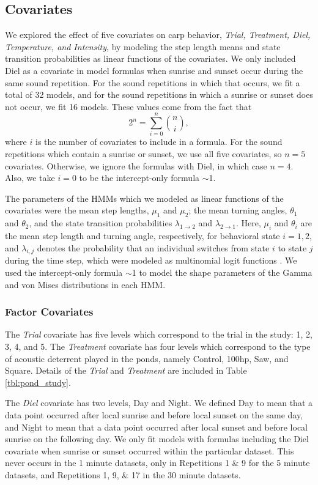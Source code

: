 \documentclass[12pt]{article}
\begin{document}
	\subsection{Covariates}
	
	We explored the effect of five covariates on carp behavior, \emph{Trial, Treatment, Diel, Temperature, and Intensity}, by modeling the step length means and state transition probabilities as linear functions of the covariates. We only included Diel as a covariate in model formulas when sunrise and sunset occur during the same sound repetition. For the sound repetitions in which that occurs, we fit a total of 32 models, and for the sound repetitions in which a sunrise or sunset does not occur, we fit 16 models. These values come from the fact that
	\[2^n = \sum_{i=0}^n {n \choose i},\]
	where $i$ is the number of covariates to include in a formula. For the sound repetitions which contain a sunrise or sunset, we use all five covariates, so $n = 5$ covariates. Otherwise, we ignore the formulas with Diel, in which case $n = 4$. Also, we take $i = 0$ to be the intercept-only formula $\sim$1.
	
	The parameters of the HMMs which we modeled as linear functions of the covariates were the mean step lengths, $\mu_1$ and $\mu_2$; the mean turning angles, $\theta_1$ and $\theta_2$, and the state transition probabilities $\lambda_{1 \to 2}$ and $\lambda_{2 \to 1}$. Here, $\mu_i$ and $\theta_i$ are the mean step length and turning angle, respectively, for behavioral state $i = 1, 2$, and $\lambda_{i, j}$ denotes the probability that an individual switches from state $i$ to state $j$ during the time step, which were modeled as multinomial logit functions \cite{Michelot2016}. We used the intercept-only formula $\sim$1 to model the shape parameters of the Gamma and von Mises distributions in each HMM.
	
	\subsubsection{Factor Covariates}
	
	The \emph{Trial} covariate has five levels which correspond to the trial in the study: 1, 2, 3, 4, and 5. The \emph{Treatment} covariate has four levels which correspond to the type of acoustic deterrent played in the ponds, namely Control, 100hp, Saw, and Square. Details of the \emph{Trial} and \emph{Treatment} are included in Table \ref{tbl:pond_study}.
	
	The \emph{Diel} covariate has two levels, Day and Night. We defined Day to mean that a data point occurred after local sunrise and before local sunset on the same day, and Night to mean that a data point occurred after local sunset and before local sunrise on the following day. We only fit models with formulas including the Diel covariate when sunrise or sunset occurred within the particular dataset. This never occurs in the 1 minute datasets, only in Repetitions 1 \& 9 for the 5 minute datasets, and Repetitions 1, 9, \& 17 in the 30 minute datasets.
	
\end{document}
